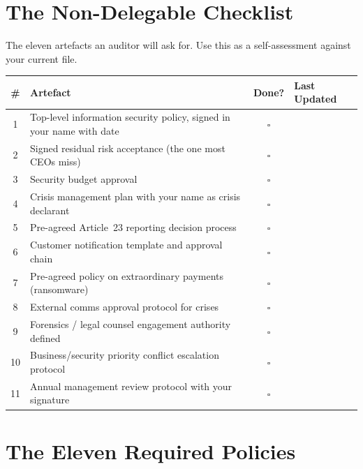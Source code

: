 \documentclass[11pt,a4paper,twoside]{book}
\begin{document}
\bigskip

\immediate\closeout\answerfile


\newpage

\chapter{The Non-Delegable Checklist}

The eleven artefacts an auditor will ask for. Use this as a self-assessment against your current file.

\begin{center}
\renewcommand{\arraystretch}{1.4}
\begin{tabularx}{\linewidth}{@{}cXcl@{}}
\toprule
\textbf{\#} & \textbf{Artefact} & \textbf{Done?} & \textbf{Last Updated} \\
\midrule
1 & Top-level information security policy, signed in your name with date & $\square$ & \\
2 & Signed residual risk acceptance (the one most CEOs miss) & $\square$ & \\
3 & Security budget approval & $\square$ & \\
4 & Crisis management plan with your name as crisis declarant & $\square$ & \\
5 & Pre-agreed Article~23 reporting decision process & $\square$ & \\
6 & Customer notification template and approval chain & $\square$ & \\
7 & Pre-agreed policy on extraordinary payments (ransomware) & $\square$ & \\
8 & External comms approval protocol for crises & $\square$ & \\
9 & Forensics / legal counsel engagement authority defined & $\square$ & \\
10 & Business/security priority conflict escalation protocol & $\square$ & \\
11 & Annual management review protocol with your signature & $\square$ & \\
\bottomrule
\end{tabularx}
\end{center}

\chapter{The Eleven Required Policies}
\end{document}
